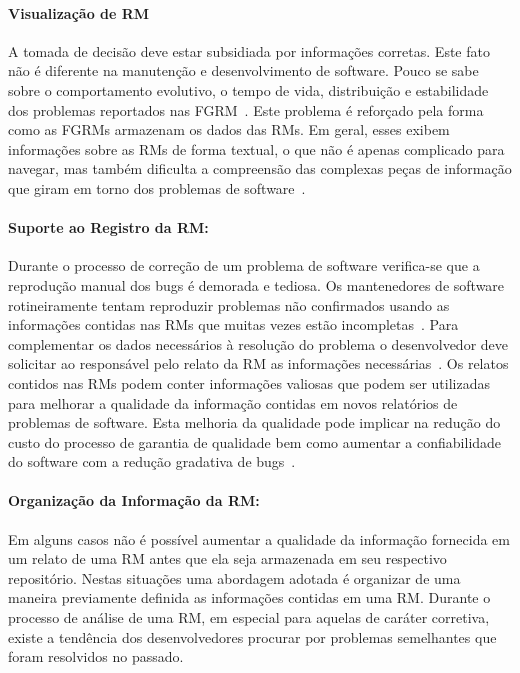 \paragraph{Visualização de RM} A tomada de decisão deve estar subsidiada por
informações corretas. Este fato não é diferente na manutenção e desenvolvimento
de software. Pouco se sabe sobre o comportamento evolutivo, o tempo de vida,
distribuição e estabilidade dos problemas reportados nas
FGRM~\cite{hora2012bug}. Este problema é reforçado pela forma como as FGRMs
armazenam os dados das RMs. Em geral, esses exibem informações sobre as RMs de
forma textual, o que não é apenas complicado para navegar, mas também dificulta
a compreensão das complexas peças de informação que giram em torno dos problemas
de software~\cite{dal2014bug}.

\paragraph{Suporte ao Registro da RM:} Durante o processo de correção de um
problema de software verifica-se que a reprodução manual dos bugs é demorada e
tediosa. Os mantenedores de software rotineiramente tentam reproduzir problemas
não confirmados usando as informações contidas nas RMs que muitas vezes estão
incompletas~\cite{White:2015:GRR:2820282.2820291}. Para complementar os dados
necessários à resolução do problema o desenvolvedor deve solicitar ao
responsável pelo relato da RM as informações necessárias~\cite{5070993}. Os
relatos contidos nas RMs podem conter informações valiosas que podem ser
utilizadas para melhorar a qualidade da informação contidas em novos relatórios
de problemas de software. Esta melhoria da qualidade pode implicar na redução do
custo do processo de garantia de qualidade bem como aumentar a confiabilidade do
software com a redução gradativa de bugs~\cite{Tu:2014:MQI:2677832.2677844}.

\paragraph{Organização da Informação da RM:} Em alguns casos não é possível
aumentar a qualidade da informação fornecida em um relato de uma RM antes que
ela seja armazenada em seu respectivo repositório.  Nestas situações uma
abordagem adotada é organizar de uma maneira previamente definida as informações
contidas em uma RM\@. Durante o processo de análise de uma RM, em especial para
aquelas de caráter corretiva, existe a tendência dos desenvolvedores procurar
por problemas semelhantes que foram resolvidos no passado.

